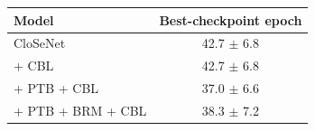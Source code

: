 \begin{tabular}{lc}
\toprule
Model & Best-checkpoint epoch \\
\midrule
CloSeNet & 42.7 $\pm$ 6.8 \\
+ CBL & 42.7 $\pm$ 6.8 \\
+ PTB + CBL & 37.0 $\pm$ 6.6 \\
+ PTB + BRM + CBL & 38.3 $\pm$ 7.2 \\
\bottomrule
\end{tabular}
